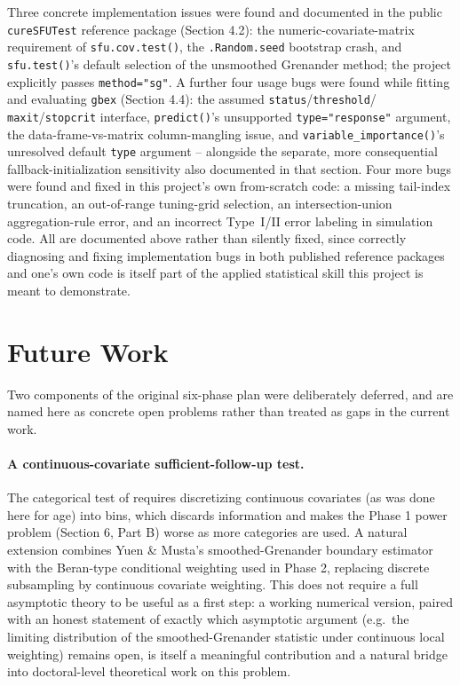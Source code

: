 \documentclass[11pt]{article}
\begin{document}
Three concrete implementation issues were found and documented in the public
\texttt{cureSFUTest} reference package (Section 4.2): the numeric-covariate-matrix
requirement of \texttt{sfu.cov.test()}, the \texttt{.Random.seed} bootstrap crash,
and \texttt{sfu.test()}'s default selection of the unsmoothed Grenander method; the
project explicitly passes \texttt{method="sg"}. A further four usage bugs were found while fitting and evaluating
\texttt{gbex} (Section 4.4): the assumed \texttt{status}/\texttt{threshold}/
\texttt{maxit}/\texttt{stopcrit} interface, \texttt{predict()}'s unsupported
\texttt{type="response"} argument, the data-frame-vs-matrix column-mangling issue,
and \texttt{variable\_importance()}'s unresolved default \texttt{type} argument --
alongside the separate, more consequential fallback-initialization sensitivity
also documented in that section. Four more bugs were found and fixed in this
project's own from-scratch code: a missing tail-index truncation, an
out-of-range tuning-grid selection, an intersection-union aggregation-rule error,
and an incorrect Type~I/II error labeling in simulation code. All are documented
above rather than silently fixed, since correctly diagnosing and fixing
implementation bugs in both published reference packages and one's own code is
itself part of the applied statistical skill this project is meant to demonstrate.


\section{Future Work}

Two components of the original six-phase plan were deliberately deferred, and are
named here as concrete open problems rather than treated as gaps in the current
work.

\paragraph{A continuous-covariate sufficient-follow-up test.} The categorical test
of \citet{yuenmustavankeilegom2025} requires discretizing continuous covariates
(as was done here for age) into bins, which discards information and makes the
Phase 1 power problem (Section 6, Part B) worse as more categories are used. A
natural extension combines Yuen \& Musta's smoothed-Grenander boundary estimator
with the Beran-type conditional weighting used in Phase 2, replacing discrete
subsampling by continuous covariate weighting. This does not require a full
asymptotic theory to be useful as a first step: a working numerical version, paired
with an honest statement of exactly which asymptotic argument (e.g.\ the limiting
distribution of the smoothed-Grenander statistic under continuous local weighting)
remains open, is itself a meaningful contribution and a natural bridge into
doctoral-level theoretical work on this problem.
\end{document}
